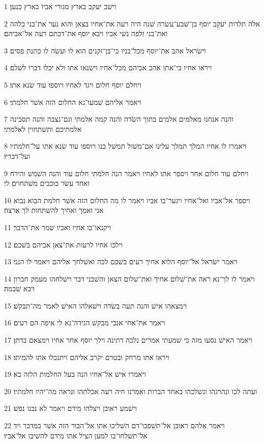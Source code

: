 \par 1 וישׁב יעקב בארץ מגורי אביו בארץ כנען׃
\par 2 אלה תלדות יעקב יוסף בן־שׁבע־עשׂרה שׁנה היה רעה את־אחיו בצאן והוא נער את־בני בלהה ואת־בני זלפה נשׁי אביו ויבא יוסף את־דבתם רעה אל־אביהם׃
\par 3 וישׂראל אהב את־יוסף מכל־בניו כי־בן־זקנים הוא לו ועשׂה לו כתנת פסים׃
\par 4 ויראו אחיו כי־אתו אהב אביהם מכל־אחיו וישׂנאו אתו ולא יכלו דברו לשׁלם׃
\par 5 ויחלם יוסף חלום ויגד לאחיו ויוספו עוד שׂנא אתו׃
\par 6 ויאמר אליהם שׁמעו־נא החלום הזה אשׁר חלמתי׃
\par 7 והנה אנחנו מאלמים אלמים בתוך השׂדה והנה קמה אלמתי וגם־נצבה והנה תסבינה אלמתיכם ותשׁתחוין לאלמתי׃
\par 8 ויאמרו לו אחיו המלך תמלך עלינו אם־משׁול תמשׁל בנו ויוספו עוד שׂנא אתו על־חלמתיו ועל־דבריו׃
\par 9 ויחלם עוד חלום אחר ויספר אתו לאחיו ויאמר הנה חלמתי חלום עוד והנה השׁמשׁ והירח ואחד עשׂר כוכבים משׁתחוים לי׃
\par 10 ויספר אל־אביו ואל־אחיו ויגער־בו אביו ויאמר לו מה החלום הזה אשׁר חלמת הבוא נבוא אני ואמך ואחיך להשׁתחות לך ארצה׃
\par 11 ויקנאו־בו אחיו ואביו שׁמר את־הדבר׃
\par 12 וילכו אחיו לרעות את־צאן אביהם בשׁכם׃
\par 13 ויאמר ישׂראל אל־יוסף הלוא אחיך רעים בשׁכם לכה ואשׁלחך אליהם ויאמר לו הנני׃
\par 14 ויאמר לו לך־נא ראה את־שׁלום אחיך ואת־שׁלום הצאן והשׁבני דבר וישׁלחהו מעמק חברון ויבא שׁכמה׃
\par 15 וימצאהו אישׁ והנה תעה בשׂדה וישׁאלהו האישׁ לאמר מה־תבקשׁ׃
\par 16 ויאמר את־אחי אנכי מבקשׁ הגידה־נא לי איפה הם רעים׃
\par 17 ויאמר האישׁ נסעו מזה כי שׁמעתי אמרים נלכה דתינה וילך יוסף אחר אחיו וימצאם בדתן׃
\par 18 ויראו אתו מרחק ובטרם יקרב אליהם ויתנכלו אתו להמיתו׃
\par 19 ויאמרו אישׁ אל־אחיו הנה בעל החלמות הלזה בא׃
\par 20 ועתה לכו ונהרגהו ונשׁלכהו באחד הברות ואמרנו חיה רעה אכלתהו ונראה מה־יהיו חלמתיו׃
\par 21 וישׁמע ראובן ויצלהו מידם ויאמר לא נכנו נפשׁ׃
\par 22 ויאמר אלהם ראובן אל־תשׁפכו־דם השׁליכו אתו אל־הבור הזה אשׁר במדבר ויד אל־תשׁלחו־בו למען הציל אתו מידם להשׁיבו אל־אביו׃
